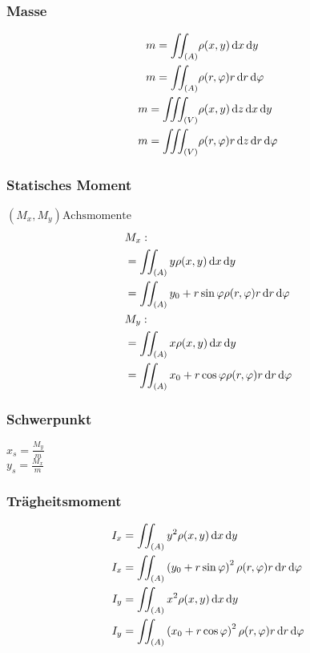 \begin{multicols}{2}
\subsubsection{Masse}
\begin{align*}
m=\iint_{(A)}&\rho(x,y)\diff x\diff y\\
m=\iint_{(A)}&\rho(r,\varphi)r\diff r\diff \varphi\\
m=\iiint_{(V)}&\rho(x,y)\diff z\diff x\diff y\\
m=\iiint_{(V)}&\rho(r,\varphi)r\diff z\diff r\diff \varphi
\end{align*}
\vfill
\subsubsection{Statisches Moment}
\( \left( M_x, M_y \right) \text{Achsmomente}\)
\begin{align*}
&M_x: \\
&=\iint_{(A)}y\rho(x,y)\diff x\diff y\\
&=\iint_{(A)}y_0+r\sin\varphi\rho(r,\varphi)r\diff r\diff \varphi\\
&M_y: \\
&=\iint_{(A)}x\rho(x,y)\diff x\diff y\\
&=\iint_{(A)}x_0+r\cos\varphi\rho(r,\varphi)r\diff r\diff \varphi
\end{align*}
\end{multicols}

\newpage
\subsubsection{Schwerpunkt}
\begin{multicols}{2}
 \(x_s=\frac{M_y}{m}\)\\
 \(y_s=\frac{M_x}{m}\)
\end{multicols}

\subsubsection{Trägheitsmoment}
\begin{align*}
I_x&=\iint_{(A)}y^2\rho(x,y)\diff x\diff y\\
I_x&=\iint_{(A)}\left(y_0+r\sin\varphi\right)^2\rho(r,\varphi)r\diff r\diff \varphi\\
I_y&=\iint_{(A)}x^2\rho(x,y)\diff x\diff y\\
I_y&=\iint_{(A)}\left(x_0+r\cos\varphi\right)^2\rho(r,\varphi)r\diff r\diff \varphi
\end{align*}

